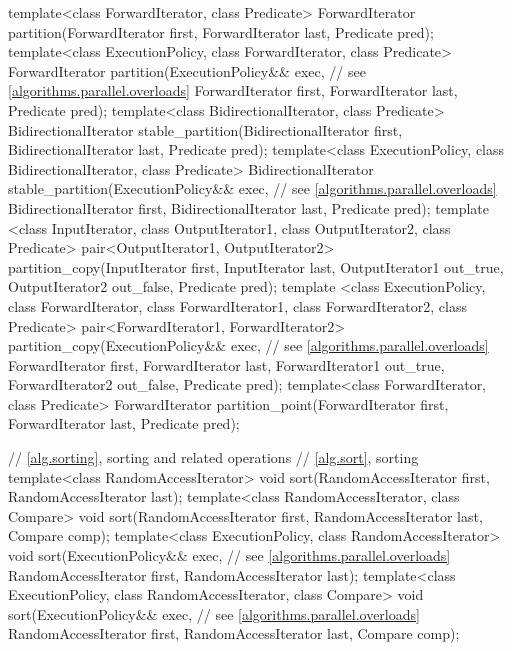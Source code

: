 \begin{codeblock}
{  template<class ForwardIterator, class Predicate>
    ForwardIterator partition(ForwardIterator first,
                              ForwardIterator last,
                              Predicate pred);
  template<class ExecutionPolicy, class ForwardIterator, class Predicate>
    ForwardIterator partition(ExecutionPolicy&& exec, // see \ref{algorithms.parallel.overloads}
                              ForwardIterator first,
                              ForwardIterator last,
                              Predicate pred);
  template<class BidirectionalIterator, class Predicate>
    BidirectionalIterator stable_partition(BidirectionalIterator first,
                                           BidirectionalIterator last,
                                           Predicate pred);
  template<class ExecutionPolicy, class BidirectionalIterator, class Predicate>
    BidirectionalIterator stable_partition(ExecutionPolicy&& exec, // see \ref{algorithms.parallel.overloads}
                                           BidirectionalIterator first,
                                           BidirectionalIterator last,
                                           Predicate pred);
  template <class InputIterator, class OutputIterator1,
            class OutputIterator2, class Predicate>
    pair<OutputIterator1, OutputIterator2>
      partition_copy(InputIterator first, InputIterator last,
                     OutputIterator1 out_true, OutputIterator2 out_false,
                     Predicate pred);
  template <class ExecutionPolicy, class ForwardIterator, class ForwardIterator1,
            class ForwardIterator2, class Predicate>
    pair<ForwardIterator1, ForwardIterator2>
      partition_copy(ExecutionPolicy&& exec, // see \ref{algorithms.parallel.overloads}
                     ForwardIterator first, ForwardIterator last,
                     ForwardIterator1 out_true, ForwardIterator2 out_false,
                     Predicate pred);
  template<class ForwardIterator, class Predicate>
    ForwardIterator partition_point(ForwardIterator first,
                                    ForwardIterator last,
                                    Predicate pred);

  // \ref{alg.sorting}, sorting and related operations
  // \ref{alg.sort}, sorting
  template<class RandomAccessIterator>
    void sort(RandomAccessIterator first, RandomAccessIterator last);
  template<class RandomAccessIterator, class Compare>
    void sort(RandomAccessIterator first, RandomAccessIterator last,
              Compare comp);
  template<class ExecutionPolicy, class RandomAccessIterator>
    void sort(ExecutionPolicy&& exec, // see \ref{algorithms.parallel.overloads}
              RandomAccessIterator first, RandomAccessIterator last);
  template<class ExecutionPolicy, class RandomAccessIterator, class Compare>
    void sort(ExecutionPolicy&& exec, // see \ref{algorithms.parallel.overloads}
              RandomAccessIterator first, RandomAccessIterator last,
              Compare comp);

}
\end{codeblock}
